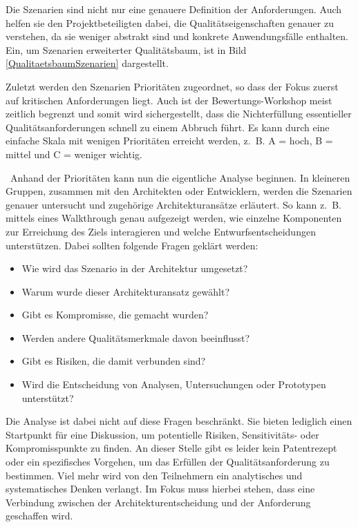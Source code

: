 Die Szenarien sind nicht nur eine genauere Definition der Anforderungen. Auch helfen sie den Projektbeteiligten dabei, die Qualitätseigenschaften genauer zu verstehen, da sie weniger abstrakt sind und konkrete Anwendungsfälle enthalten. Ein, um Szenarien erweiterter Qualitätsbaum, ist in Bild \ref{QualitaetsbaumSzenarien} dargestellt.


Zuletzt werden den Szenarien Prioritäten zugeordnet, so dass der Fokus zuerst auf kritischen Anforderungen liegt. Auch ist der Bewertungs-Workshop meist zeitlich begrenzt und somit wird sichergestellt, dass die Nichterfüllung essentieller Qualitätsanforderungen schnell zu einem Abbruch führt. Es kann durch eine einfache Skala mit wenigen Prioritäten erreicht werden, z.~B. A = hoch, B = mittel und C = weniger wichtig.

\
Anhand der Prioritäten kann nun die eigentliche Analyse beginnen. In kleineren Gruppen, zusammen mit den Architekten oder Entwicklern, werden die Szenarien genauer untersucht und zugehörige Architekturansätze erläutert.
So kann z.~B. mittels eines Walkthrough genau aufgezeigt werden, wie einzelne Komponenten zur Erreichung des Ziels interagieren und welche Entwurfsentscheidungen unterstützen\cite{Starke2015}. Dabei sollten folgende Fragen geklärt werden: 

\begin{itemize}
	\item Wie wird das Szenario in der Architektur umgesetzt?
	\item Warum wurde dieser Architekturansatz gewählt?
	\item Gibt es Kompromisse, die gemacht wurden?
	\item Werden andere Qualitätsmerkmale davon beeinflusst?
	\item Gibt es Risiken, die damit verbunden sind?
	\item Wird die Entscheidung von Analysen, Untersuchungen oder Prototypen unterstützt?
\end{itemize}

Die Analyse ist dabei nicht auf diese Fragen beschränkt. Sie bieten lediglich einen Startpunkt für eine Diskussion, um potentielle Risiken, Sensitivitäts- oder Kompromisspunkte zu finden. An dieser Stelle gibt es leider kein Patentrezept oder ein spezifisches Vorgehen, um das Erfüllen der Qualitätsanforderung zu bestimmen. Viel mehr wird von den Teilnehmern ein analytisches und systematisches Denken verlangt. Im Fokus muss hierbei stehen, dass eine Verbindung zwischen der Architekturentscheidung und der Anforderung geschaffen wird.

